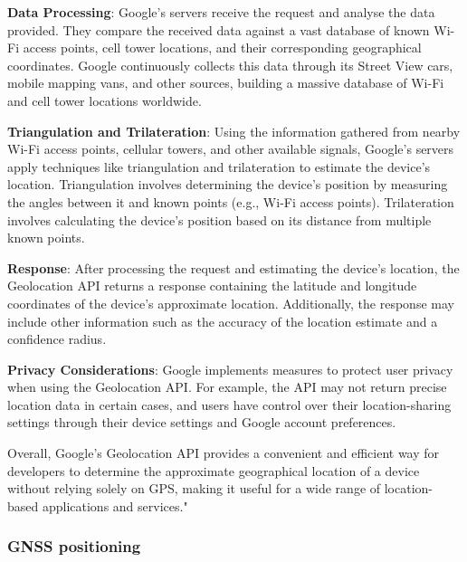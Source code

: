 \textbf{Data Processing}: Google's servers receive the request and analyse the data provided. They compare the received data against a vast database of known Wi-Fi access points, cell tower locations, and their corresponding geographical coordinates. Google continuously collects this data through its Street View cars, mobile mapping vans, and other sources, building a massive database of Wi-Fi and cell tower locations worldwide.

\textbf{Triangulation and Trilateration}: Using the information gathered from nearby Wi-Fi access points, cellular towers, and other available signals, Google's servers apply techniques like triangulation and trilateration to estimate the device's location. Triangulation involves determining the device's position by measuring the angles between it and known points (e.g., Wi-Fi access points). Trilateration involves calculating the device's position based on its distance from multiple known points.

\textbf{Response}: After processing the request and estimating the device's location, the Geolocation API returns a response containing the latitude and longitude coordinates of the device's approximate location. Additionally, the response may include other information such as the accuracy of the location estimate and a confidence radius.

\textbf{Privacy Considerations}: Google implements measures to protect user privacy when using the Geolocation API. For example, the \ac{API} may not return precise location data in certain cases, and users have control over their location-sharing settings through their device settings and Google account preferences.

Overall, Google's Geolocation API provides a convenient and efficient way for developers to determine the approximate geographical location of a device without relying solely on \ac{GPS}, making it useful for a wide range of location-based applications and services."


\subsubsection{GNSS positioning}

